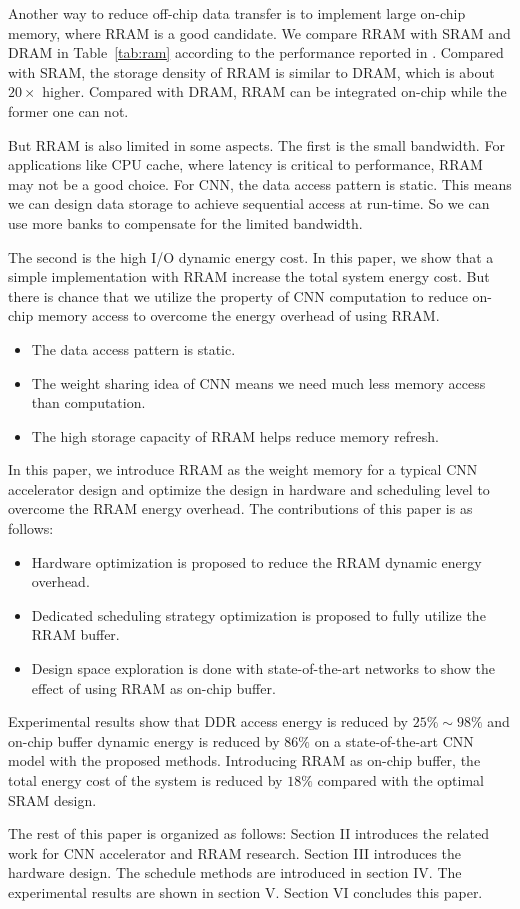 Another way to reduce off-chip data transfer is to implement large on-chip memory, where RRAM is a good candidate. We compare RRAM with SRAM and DRAM in Table~\ref{tab:ram} according to the performance reported in \cite{ee598, fackenthal201419, dong2014nvsim}. Compared with SRAM, the storage density of RRAM is similar to DRAM, which is about $20\times$ higher. Compared with DRAM, RRAM can be integrated on-chip while the former one can not.



But RRAM is also limited in some aspects. The first is the small bandwidth. For applications like CPU cache, where latency is critical to performance, RRAM may not be a good choice. For CNN, the data access pattern is static. This means we can design data storage to achieve sequential access at run-time. So we can use more banks to compensate for the limited bandwidth.

The second is the high I/O dynamic energy cost. In this paper, we show that a simple implementation with RRAM increase the total system energy cost. But there is chance that we utilize the property of CNN computation to reduce on-chip memory access to overcome the energy overhead of using RRAM. 

\begin{itemize}
\item {The data access pattern is static. }
\item {The weight sharing idea of CNN means we need much less memory access than computation.}
\item {The high storage capacity of RRAM helps reduce memory refresh.}
\end{itemize}

In this paper, we introduce RRAM as the weight memory for a typical CNN accelerator design and optimize the design in hardware and scheduling level to overcome the RRAM energy overhead. The contributions of this paper is as follows:
\begin{itemize}
\item {Hardware optimization is proposed to reduce the RRAM dynamic energy overhead.}
\item {Dedicated scheduling strategy optimization is proposed to fully utilize the RRAM buffer.}
\item {Design space exploration is done with state-of-the-art networks to show the effect of using RRAM as on-chip buffer.}
\end{itemize}
Experimental results show that DDR access energy is reduced by $25\%\sim 98\%$ and on-chip buffer dynamic energy is reduced by $86\%$ on a state-of-the-art CNN model with the proposed methods. Introducing RRAM as on-chip buffer, the total energy cost of the system is reduced by $18\%$ compared with the optimal SRAM design.

The rest of this paper is organized as follows: Section II introduces the related work for CNN accelerator and RRAM research. Section III introduces the hardware design. The schedule methods are introduced in section IV. The experimental results are shown in section V. Section VI concludes this paper.